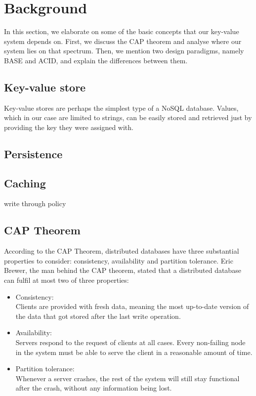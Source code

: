 \section{Background}
\label{sec:background}
In this section, we elaborate on some of the basic concepts that our key-value system depends on. First, we discuss the CAP theorem and analyse where our system lies on that spectrum. Then, we mention two design paradigms, namely BASE and ACID, and explain the differences between them.

\subsection{Key-value store}
Key-value stores are perhaps the simplest type of a NoSQL database. Values, which in our case are limited to strings, can be easily stored and retrieved just by providing the key they were assigned with. 

\subsection{Persistence}

\subsection{Caching}
write through policy

\subsection{CAP Theorem}
\label{sec:background_cap} 
According to the CAP Theorem, distributed databases have three substantial properties to consider: consistency, availability and partition tolerance\cite{brewer2012cap}. Eric Brewer, the man behind the CAP theorem, stated that a distributed database can fulfil at most two of three properties\cite{brewer2000cap}:

\begin{itemize}
  \item Consistency: \\
  Clients are provided with fresh data, meaning the most up-to-date version of the data that got stored after the last write operation.
  \item Availability: \\
  Servers respond to the request of clients at all cases. Every non-failing node in the system must be able to serve the client in a reasonable amount of time\cite{gilbert2002brewer}.
  \item Partition tolerance: \\
  Whenever a server crashes, the rest of the system will still stay functional after the crash, without any information being lost.
\end{itemize}

